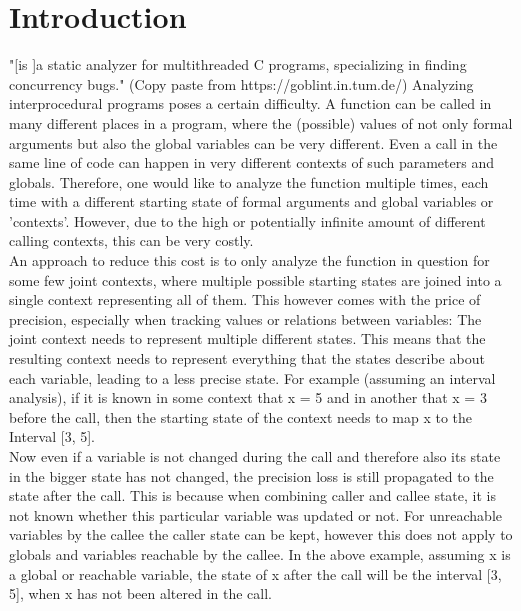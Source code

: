 
\chapter{Introduction}\label{chapter:introduction}

  "[\Gob is ]a static analyzer for multithreaded C programs, specializing in finding concurrency bugs." (Copy paste from https://goblint.in.tum.de/)
  Analyzing interprocedural programs poses a certain difficulty. A function can be called in many different places in a program, where the (possible) values of not only formal arguments but also the global variables can be very different. Even a call in the same line of code can happen in very different contexts of such parameters and globals. Therefore, one would like to analyze the function multiple times, each time with a different starting state of formal arguments and global variables or 'contexts'. However, due to the high or potentially infinite amount of different calling contexts, this can be very costly. \\
An approach to reduce this cost is to only analyze the function in question for some few joint contexts, where multiple possible starting states are joined into a single context representing all of them. This however comes with the price of precision, especially when tracking values or relations between variables: The joint context needs to represent multiple different states. This means that the resulting context needs to represent everything that the states describe about each variable, leading to a less precise state. For example (assuming an interval analysis), if it is known in some context that x = 5 and in another that x = 3 before the call, then the starting state of the context needs to map x to the Interval [3, 5]. \\
Now even if a variable is not changed during the call and therefore also its state in the bigger state has not changed, the precision loss is still propagated to the state after the call. This is because when combining caller and callee state, it is not known whether this particular variable was updated or not. For unreachable variables by the callee the caller state can be kept, however this does not apply to globals and variables reachable by the callee. In the above example, assuming x is a global or reachable variable, the state of x after the call will be the interval [3, 5], when x has not been altered in the call.\\
